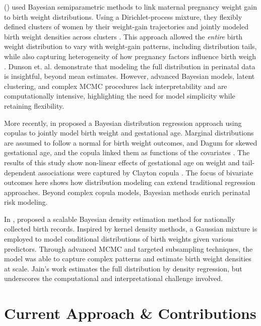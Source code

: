 \textcite{dunson2008} (\citeyear{dunson2008}) used Bayesian semiparametric methods to link maternal pregnancy weight gain to birth weight distributions. Using a Dirichlet-process mixture, they flexibly defined clusters of women by their weight-gain trajectories and jointly modeled birth weight densities across clusters \parencite{dunson2008}. This approach allowed the \emph{entire} birth weight distribution to vary with weight-gain patterns, including distribution tails, while also capturing heterogeneity of how pregnancy factors influence birth weigh \parencite{dunson2008}. Dunson et. al. demonstrate that modeling the full distribution in perinatal data is insightful, beyond mean estimates. However, advanced Bayesian models, latent clustering, and complex MCMC procedures lack interpretability and are computationally intensive, highlighting the need for model simplicity while retaining flexibility.

More recently, \textcite{rathjens2023} in \citeyear{rathjens2023} proposed a Bayesian distribution regression approach using copulas to jointly model birth weight and gestational age. Marginal distributions are assumed to follow a normal for birth weight outcomes, and Dagum for skewed gestational age, and the copula linked them as functions of the covariates \parencite{rathjens2023}. The results of this study show non-linear effects of gestational age on weight and tail-dependent associations were captured by Clayton copula \parencite{rathjens2023}. The focus of bivariate outcomes here shows how distribution modeling can extend traditional regression approaches. Beyond complex copula models, Bayesian methods enrich perinatal risk modeling. 

In \citeyear{jain2024}, \textcite{jain2024} proposed a scalable Bayesian density estimation method for nationally collected birth records. Inspired by kernel density methods, a Gaussian mixture is employed to model conditional distributions of birth weights given various predictors. Through advanced MCMC and targeted subsampling techniques, the model was able to capture complex patterns and estimate birth weight densities at scale. Jain's work estimates the full distribution by density regression, but underscores the computational and interpretational challenge involved.

\section{Current Approach \& Contributions}
\label{sec:ch2-current-approach}

